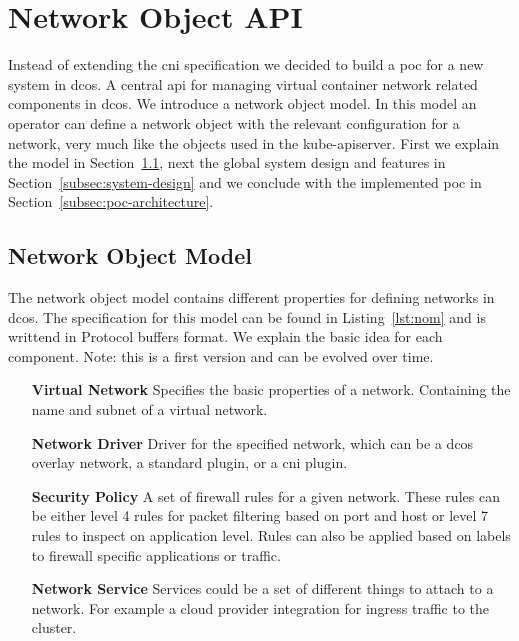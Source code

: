 \section{Network Object API}
\label{sec:networkobject-api}
Instead of extending the \gls{cni} specification we decided to build a \gls{poc} for a new system in \gls{dcos}. A central \gls{api} for managing virtual container network related components in \gls{dcos}. We introduce a network object model. In this model an operator can define a network object with the relevant configuration for a network, very much like the objects used in the kube-apiserver. First we explain the model in Section~\ref{subsec:network-object-model}, next the global system design and features in Section~\ref{subsec:system-design} and we conclude with the implemented \gls{poc} in Section~\ref{subsec:poc-architecture}.

\subsection{Network Object Model}
\label{subsec:network-object-model}
The network object model contains different properties for defining networks in \gls{dcos}. The specification for this model can be found in Listing~\ref{lst:nom} and is writtend in Protocol buffers format. We explain the basic idea for each component. Note: this is a first version and can be evolved over time.



\begin{itemize}
    \item[\textbf{Virtual Network}] Specifies the basic properties of a network. Containing the name and subnet of a virtual network.
    \item[\textbf{Network Driver}] Driver for the specified network, which can be  a \gls{dcos} overlay network, a standard plugin, or a \gls{cni} plugin.
    \item[\textbf{Security Policy}] A set of firewall rules for a given network. These rules can be either level 4 rules for packet filtering based on port and host or level 7 rules to inspect on application level. Rules can also be applied based on labels to firewall specific applications or traffic.
    \item[\textbf{Network Service}] Services could be a set of different things to attach to a network. For example a cloud provider integration for ingress traffic to the cluster.
\end{itemize}


